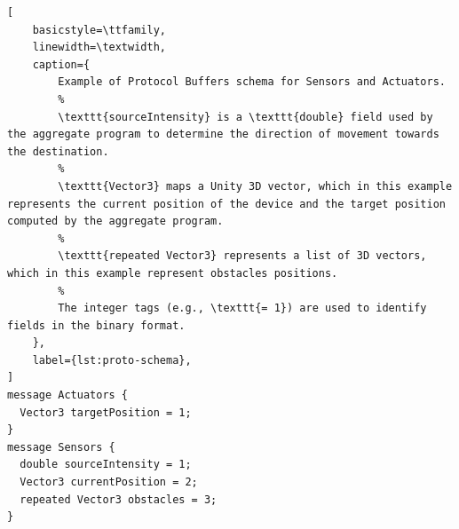 \begin{lstlisting}[
    basicstyle=\ttfamily,
    linewidth=\textwidth,
    caption={
        Example of Protocol Buffers schema for Sensors and Actuators.
        %
        \texttt{sourceIntensity} is a \texttt{double} field used by the aggregate program to determine the direction of movement towards the destination.
        %
        \texttt{Vector3} maps a Unity 3D vector, which in this example represents the current position of the device and the target position computed by the aggregate program.
        %
        \texttt{repeated Vector3} represents a list of 3D vectors, which in this example represent obstacles positions.
        %
        The integer tags (e.g., \texttt{= 1}) are used to identify fields in the binary format.
    },
    label={lst:proto-schema},
]
message Actuators {
  Vector3 targetPosition = 1;
}
message Sensors {
  double sourceIntensity = 1;
  Vector3 currentPosition = 2;
  repeated Vector3 obstacles = 3;
}
\end{lstlisting}

%
%
%
%

